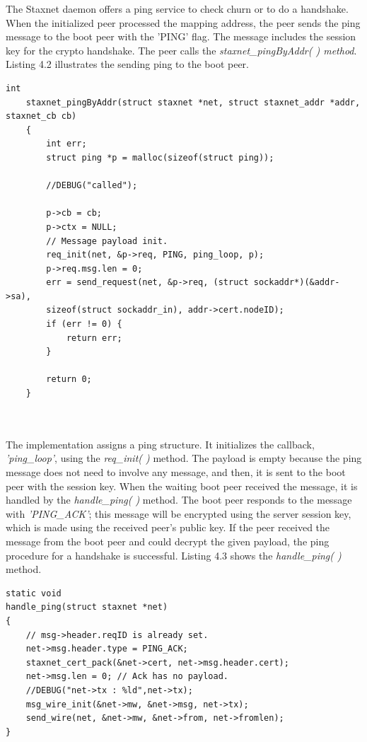 The Staxnet daemon offers a ping service to check churn or to do a handshake. When the initialized peer processed the mapping address, the peer sends the ping message to the boot peer with the 'PING' flag. The message includes the session key for the crypto handshake. The peer calls the \textit{staxnet\_pingByAddr( ) method}. Listing 4.2 illustrates the sending ping to the boot peer.

\lstset{language=C} 
\begin{lstlisting}[caption=Sending ping to the boot peer]
	int
	staxnet_pingByAddr(struct staxnet *net, struct staxnet_addr *addr, staxnet_cb cb)
	{
		int err;
		struct ping *p = malloc(sizeof(struct ping));
		
		//DEBUG("called");
		
		p->cb = cb;
		p->ctx = NULL;
		// Message payload init.
		req_init(net, &p->req, PING, ping_loop, p); 
		p->req.msg.len = 0;
		err = send_request(net, &p->req, (struct sockaddr*)(&addr->sa),
		sizeof(struct sockaddr_in), addr->cert.nodeID);
		if (err != 0) {
			return err;
		}
		
		return 0;
	}
	
	
\end{lstlisting}

The implementation assigns a ping structure. It initializes the callback, \textit{'ping\_loop'}, using the \textit{req\_init( )} method. The payload is empty because the ping message does not need to involve any message, and then, it is sent to the boot peer with the session key. When the waiting boot peer received the message, it is handled by the \textit{handle\_ping( )} method. The boot peer responds to the message with \textit{'PING\_ACK'}; this message will be encrypted using the server session key, which is made using the received peer's public key. If the peer received the message from the boot peer and could decrypt the given payload, the ping procedure for a handshake is successful. Listing 4.3 shows the \textit{handle\_ping( )} method.

\lstset{language=C} 
\begin{lstlisting}[caption=The handle\_ping( ) method]
static void
handle_ping(struct staxnet *net)
{
	// msg->header.reqID is already set.
	net->msg.header.type = PING_ACK;
	staxnet_cert_pack(&net->cert, net->msg.header.cert);
	net->msg.len = 0; // Ack has no payload.
	//DEBUG("net->tx : %ld",net->tx);
	msg_wire_init(&net->mw, &net->msg, net->tx);
	send_wire(net, &net->mw, &net->from, net->fromlen);
}

	
\end{lstlisting}

